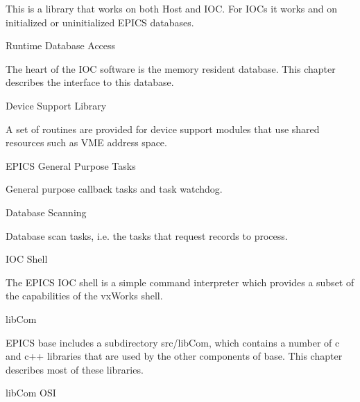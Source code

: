 \begin{description}\item This is a library that works on both Host and IOC. For IOCs it works and on initialized or uninitialized EPICS 
databases.

\end{description}Runtime Database Access

\begin{description}\item The heart of the IOC software is the memory resident database. This chapter describes the interface to this 
database.

\end{description}Device Support Library

\begin{description}\item A set of routines are provided for device support modules that use shared resources such as VME address space.

\end{description}EPICS General Purpose Tasks

\begin{description}\item General purpose callback tasks and  task watchdog.

\end{description}Database Scanning

\begin{description}\item Database scan tasks, i.e. the tasks that request records to process.

\end{description}IOC Shell

\begin{description}\item The EPICS IOC shell is a simple command interpreter which provides a subset of the capabilities of the vxWorks 
shell.

\end{description}libCom

\begin{description}\item EPICS base includes a subdirectory src/libCom, which contains a number of c and c++ libraries that are used by 
the other components of base. This chapter describes most of these libraries.

\end{description}libCom OSI

